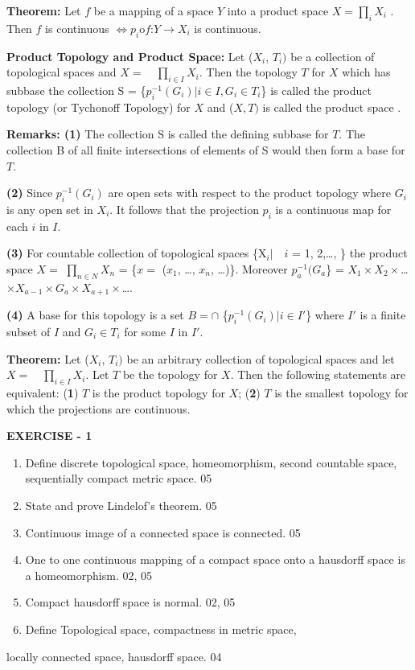 \documentclass[12pt]{amsart}
\begin{document}
\textbf{Theorem: }Let $f$ be a mapping of a space $Y$ into a product space $X =\prod\nolimits_i 
{X_i } $ . Then $f$ is continuous $\Leftrightarrow p_{i}$o$f $:$Y \to X_{i}$ is 
continuous. 

\textbf{Product Topology and Product Space:} Let ($X_{i}$, $T_{i})$ be a 
collection of topological spaces and $X = \quad \prod\limits_{i\in I} {X_i } $. Then 
the topology $T$ for $X$ which has subbase the collection S = 
{\{}$p_{i}^{-1}(G_{i})\vert i\in I, G_{i}\in T_{i}${\}} is called the 
product topology (or Tychonoff Topology) for $X$ and ($X, T)$ is called the product 
space .

\textbf{Remarks: (1)} The collection S is called the defining subbase for 
$T$. The collection B of all finite intersections of elements of S would then 
form a base for $T$.

\textbf{(2)} Since $p_{i}^{-1}(G_{i})$ are open sets with respect to the 
product topology where $G_{i}$ is any open set in $X_{i}$. It follows that the 
projection $p_{i}$ is a continuous map for each $i$ in $I$.

\textbf{(3)} For countable collection of topological spaces 
{\{}X$_{i}\vert  \quad i$ = 1, 2,{\ldots}, {\}} the product space $X =$ 
$\prod\limits_{n\in N} {X_n } $ = {\{}$x =$ ($x_{1}$, {\ldots}, $x_{n}$, 
{\ldots}){\}}. Moreover $p_{a}^{-1}(G_{a}${\}} = $X_{1}\times 
X_{2}\times ${\ldots}$\times X_{a-1} \times  G_{a}\times X_{a+1} 
\times ${\ldots}.

\textbf{(4)} A base for this topology is a set $B = \cap $ {\{}$p_{i}^{-1}(G_{i})\vert 
i\in I'${\}} where $I'$ is a finite subset of $I$ and $G_{i}\in T_{i}$ for some 
$I$ in $I'.$ 

\textbf{Theorem:} Let ($X_{i}$, $T_{i})$ be an arbitrary collection of 
topological spaces and let$ X = \quad \prod\limits_{i\in I} {X_i } $. Let $T$ be the 
topology for $X$. Then the following statements are equivalent: (\textbf{1}) 
$T$ is the product topology for $X$; (\textbf{2}) $T$ is the smallest topology for 
which the projections are continuous. 

\textbf{EXERCISE - 1}

\begin{enumerate}
\item Define discrete topological space, homeomorphism, second countable space, sequentially compact metric space. 05
\item State and prove Lindelof's theorem. 05
\item Continuous image of a connected space is connected. 05
\item One to one continuous mapping of a compact space onto a hausdorff space is a homeomorphism. 02, 05
\item Compact hausdorff space is normal. 02, 05
\item Define Topological space, compactness in metric space, 
\end{enumerate}
locally connected space, hausdorff space. 04
\end{document}
